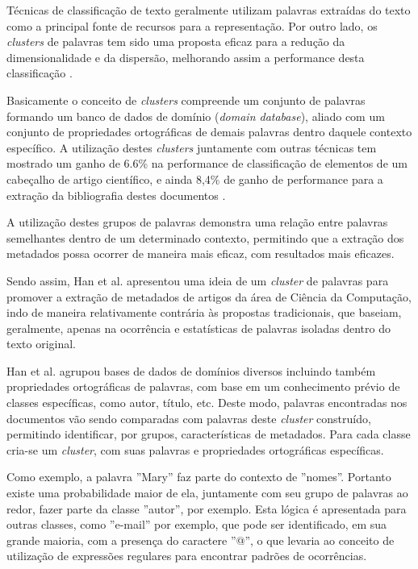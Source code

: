 \begin{textonovo}

Técnicas de classificação de texto geralmente utilizam palavras extraídas do texto como a principal fonte de recursos para a representação. Por outro lado, os \textit{clusters} de palavras tem sido uma proposta eficaz para a redução da dimensionalidade e da dispersão, melhorando assim a performance desta classificação \cite{Han-Giles-WC}.

Basicamente o conceito de \textit{clusters} compreende um conjunto de palavras formando um banco de dados de domínio (\textit{domain database}), aliado com um conjunto de propriedades ortográficas de demais palavras dentro daquele contexto específico. A utilização destes \textit{clusters} juntamente com outras técnicas tem mostrado um ganho de 6.6\% na performance de classificação de elementos de um cabeçalho de artigo científico, e ainda 8,4\% de ganho de performance para a extração da bibliografia destes documentos \cite{Han-Giles-WC}.

A utilização destes grupos de palavras demonstra uma relação entre palavras semelhantes dentro de um determinado contexto, permitindo que a extração dos metadados possa ocorrer de maneira mais eficaz, com resultados mais eficazes.

\end{textonovo}


\begin{textoalterado}

Sendo assim, Han et al. apresentou uma ideia de um \textit{cluster} de palavras para promover a extração de metadados de artigos da área de Ciência da Computação, indo de maneira relativamente contrária às propostas tradicionais, que baseiam, geralmente, apenas na ocorrência e estatísticas de palavras isoladas dentro do texto original.

Han et al. agrupou bases de dados de domínios diversos incluindo também propriedades ortográficas de palavras, com base em um conhecimento prévio de classes específicas, como autor, título, etc. Deste modo, palavras encontradas nos documentos vão sendo comparadas com palavras deste \textit{cluster} construído, permitindo identificar, por grupos, características de metadados. Para cada classe cria-se um \textit{cluster}, com suas palavras e propriedades ortográficas específicas.

Como exemplo, a palavra ''Mary'' faz parte do contexto de ''nomes''. Portanto existe uma probabilidade maior de ela, juntamente com seu grupo de palavras ao redor, fazer parte da classe ''autor'', por exemplo. Esta lógica é apresentada para outras classes, como ''e-mail'' por exemplo, que pode ser identificado, em sua grande maioria, com a presença do caractere ''@'', o que levaria ao conceito de utilização de expressões regulares para encontrar padrões de ocorrências.

\end{textoalterado}

